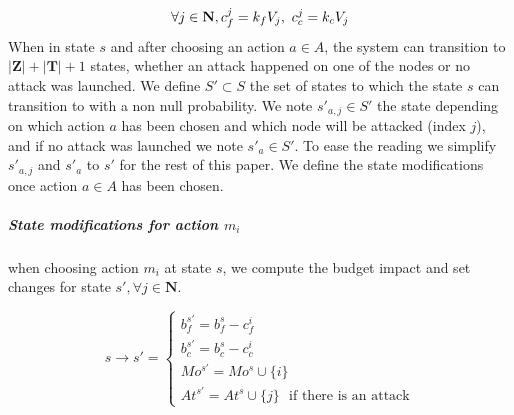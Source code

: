 \begin{equation}
\forall j \in \textbf{N}, c_f^j = k_{f}  V_j,~ c_c^j = k_{c}  V_j\\ 
\end{equation}
When in state $s$ and after choosing an action $a \in A$, the system can transition to $|\textbf{Z}|+|\textbf{T}| + 1 $ states, whether an attack happened on one of the nodes or no attack was launched.
We define $S' \subset S$ the set of states to which the state $s$ can transition to with a non null probability.
We note $s'_{a,j} \in S'$ the state depending on which action $a$ has been chosen and which node will be attacked (index $j$), and if no attack was launched we note $s'_a \in S'$. To ease the reading we simplify $s'_{a,j}$ and $s'_a$ to $s'$ for the rest of this paper.
We define the state modifications once action $a \in A$ has been chosen.
\\
\subparagraph*{\textbf{State modifications for action $m_i$}}
when choosing action $m_i$ at state $s$, we compute the budget impact and set changes for state $s', \forall j \in \textbf{N}$. 

\begin{equation}
  s \longrightarrow s' =\begin{cases}
    b_f^{s'} = b_f^s - c_f^i\\
    b_c^{s'} = b_c^s - c_c^i\\
    Mo^{s'} = Mo^s \cup \{i\}\\
    At^{s'} = At^s \cup \{j\} \text{~~if there is an attack}
  \end{cases}
\end{equation}

